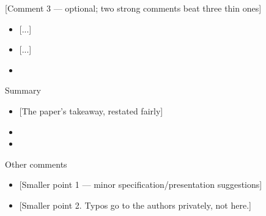 \documentclass[11pt, aspectratio=169]{beamer}
\begin{document}
\begin{frame}[t]{[Comment 3 — optional; two strong comments beat three thin ones]}
  \medskip
  \begin{itemize}
    \item {} [...]
    \item {[...]}
    \item[$\Rightarrow$] [...]
  \end{itemize}
\end{frame}

\begin{frame}[t]{Summary}
  \medskip
  \begin{itemize}
    \item {[The paper's takeaway, restated fairly]}
    \item[$\Rightarrow$] [Comment 1 in one line]
    \item[$\Rightarrow$] [Comment 2 in one line]
  \end{itemize}
\end{frame}

\begin{frame}[noframenumbering]{Other comments}
  \begin{itemize}
    \item {[Smaller point 1 — minor specification/presentation suggestions]}
    \item {[Smaller point 2. Typos go to the authors privately, not here.]}
  \end{itemize}
\end{frame}
\end{document}
